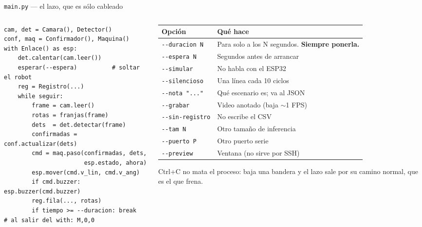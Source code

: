 \begin{frame}[fragile]{\texttt{main.py} --- el lazo, que es sólo cableado}
\begin{columns}[T,onlytextwidth]
\begin{column}{0.53\textwidth}
\scriptsize
\begin{verbatim}
cam, det = Camara(), Detector()
conf, maq = Confirmador(), Maquina()
with Enlace() as esp:
    det.calentar(cam.leer())
    esperar(--espera)          # soltar el robot
    reg = Registro(...)
    while seguir:
        frame = cam.leer()
        rotas = franjas(frame)
        dets  = det.detectar(frame)
        confirmadas = conf.actualizar(dets)
        cmd = maq.paso(confirmadas, dets,
                       esp.estado, ahora)
        esp.mover(cmd.v_lin, cmd.v_ang)
        if cmd.buzzer: esp.buzzer(cmd.buzzer)
        reg.fila(..., rotas)
        if tiempo >= --duracion: break
# al salir del with: M,0,0
\end{verbatim}
\end{column}
\begin{column}{0.45\textwidth}
\footnotesize
\begin{tabular}{L{2.1cm}L{3.9cm}}
  \toprule
  \textbf{Opción} & \textbf{Qué hace} \\
  \midrule
  \verb|--duracion N| & Para solo a los N segundos. \textbf{Siempre ponerla.} \\
  \verb|--espera N| & Segundos antes de arrancar \\
  \verb|--simular| & No habla con el ESP32 \\
  \verb|--silencioso| & Una línea cada 10 ciclos \\
  \verb|--nota "..."| & Qué escenario es; va al JSON \\
  \verb|--grabar| & Video anotado (baja $\sim$1 FPS) \\
  \verb|--sin-registro| & No escribe el CSV \\
  \verb|--tam N| & Otro tamaño de inferencia \\
  \verb|--puerto P| & Otro puerto serie \\
  \verb|--preview| & Ventana (no sirve por SSH) \\
  \bottomrule
\end{tabular}

\vspace{0.3em}
Ctrl+C no mata el proceso: baja una bandera y el lazo sale por su camino
normal, que es el que frena.
\end{column}
\end{columns}
\end{frame}

